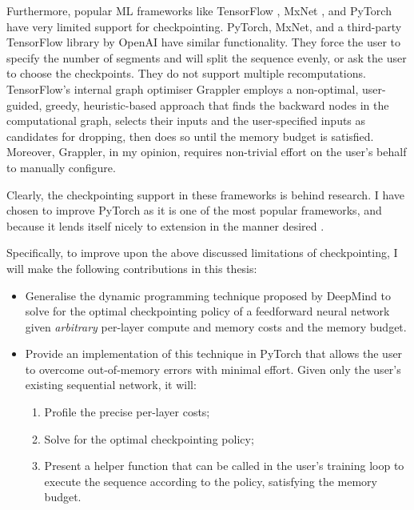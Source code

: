 Furthermore, popular ML frameworks like TensorFlow \cite{tensorflow2015-whitepaper}, MxNet \cite{mxnet2015}, and PyTorch \cite{Paszke2017} have very limited support for checkpointing. PyTorch, MxNet, and a third-party TensorFlow library by OpenAI \cite{Salimans2018} have similar functionality. They force the user to specify the number of segments and will split the sequence evenly, or ask the user to choose the checkpoints. They do not support multiple recomputations. TensorFlow's internal graph optimiser Grappler employs a non-optimal, user-guided, greedy, heuristic-based approach that finds the backward nodes in the computational graph, selects their inputs and the user-specified inputs as candidates for dropping, then does so until the memory budget is satisfied. Moreover, Grappler, in my opinion, requires non-trivial effort on the user's behalf to manually configure.

Clearly, the checkpointing support in these frameworks is behind research. I have chosen to improve PyTorch as it is one of the most popular frameworks, and because it lends itself nicely to extension in the manner desired .

Specifically, to improve upon the above discussed limitations of checkpointing, I will make the following contributions in this thesis:
\begin{itemize}[topsep=0pt]
    \item Generalise the dynamic programming technique proposed by DeepMind to solve for the optimal checkpointing policy of a feedforward neural network given \textit{arbitrary} per-layer compute and memory costs and the memory budget.
    \item Provide an implementation of this technique in PyTorch that allows the user to overcome out-of-memory errors with minimal effort. Given only the user's existing sequential network, it will:
    \begin{enumerate}
        \item Profile the precise per-layer costs;
        \item Solve for the optimal checkpointing policy;
        \item Present a helper function that can be called in the user's training loop to execute the sequence according to the policy, satisfying the memory budget.
    \end{enumerate}
\end{itemize}

